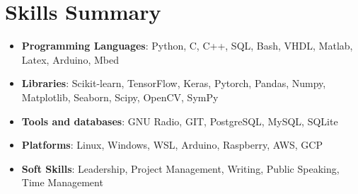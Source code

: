 \documentclass[a4paper,20pt]{article}
\newcommand{\resumeItem}[2]{
  \item\small{
    \textbf{#1}{: #2 \vspace{-2pt}}
  }
}
\newcommand{\resumeSubItem}[2]{\resumeItem{#1}{#2}\vspace{-3pt}}
\newcommand{\resumeSubHeadingListStart}{\begin{itemize}[leftmargin=*]}
\newcommand{\resumeSubHeadingListEnd}{\end{itemize}}
\begin{document}
\vspace{-5pt}
\section{Skills Summary}
	\resumeSubHeadingListStart
    \resumeSubItem{Programming Languages}{Python, C, C++, SQL, Bash, VHDL, Matlab, Latex, Arduino, Mbed} %
    \resumeSubItem{Libraries}{Scikit-learn, TensorFlow, Keras, Pytorch, Pandas, Numpy, Matplotlib, Seaborn, Scipy, OpenCV, SymPy} %
    \resumeSubItem{Tools and databases}{GNU Radio, GIT, PostgreSQL, MySQL, SQLite} %
    \resumeSubItem{Platforms}{Linux, Windows, WSL, Arduino, Raspberry, AWS, GCP}
    \resumeSubItem{Soft Skills}{Leadership, Project Management, Writing, Public Speaking, Time Management}
  \resumeSubHeadingListEnd

\vspace{-5pt}
\end{document}
